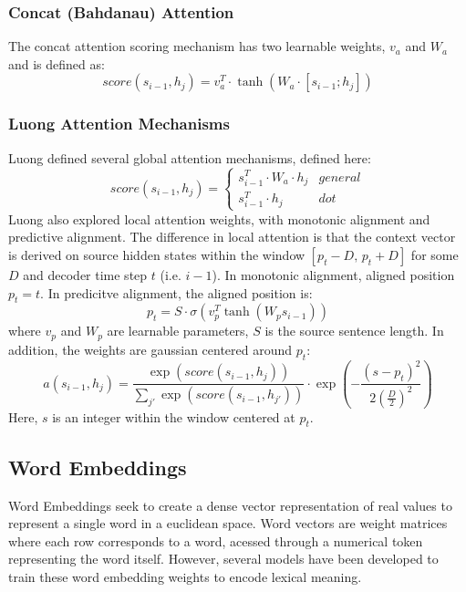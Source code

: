 \documentclass[twoside,twocolumn]{article}
\begin{document}
\subsubsection{Concat (Bahdanau) Attention}
The concat attention scoring mechanism has two learnable weights, $v_a$ and $W_a$
and is defined as:
\begin{equation}
  score(s_{i-1}, h_j) = v_a^T \cdot \tanh \left( W_a \cdot \left[ s_{i-1} ; h_j \right] \right)
\end{equation}
\subsubsection{Luong Attention Mechanisms}
Luong defined several global attention mechanisms, defined here:
\begin{equation}
  score(s_{i-1}, h_j) =
    \begin{cases}
      s_{i-1}^T \cdot W_a \cdot h_j & general \\
      s_{i-1}^T \cdot h_j & dot
    \end{cases}
\end{equation}
Luong also explored local attention weights, with monotonic alignment and
predictive alignment. The difference in local attention is that the
context vector is derived on source hidden states within the window
$\left[p_t - D , \, p_t + D\right]$ for some $D$ and decoder time step $t$ (i.e. $i-1$).
In monotonic alignment, aligned position $p_t=t$.
In predicitve alignment, the aligned position is:
\begin{equation}
  p_t = S \cdot \sigma \left( v_p^T \tanh \left( W_p s_{i-1} \right) \right)
\end{equation}
where $v_p$ and $W_p$ are learnable parameters,
$S$ is the source sentence length. In addition, the weights are gaussian centered
around $p_t$:
\begin{equation}
  a(s_{i-1}, h_j) = \frac{\exp(score(s_{i-1}, h_j))}{\sum_{j'} \exp(score(s_{i-1}, h_{j'}))} \cdot \exp\left(-\frac{(s-p_t)^2}{2\left(\frac{D}{2}\right)^2}\right)
\end{equation}
Here, $s$ is an integer within the window centered at $p_t$.


\subsection{Word Embeddings}
Word Embeddings seek to create a dense vector representation of real values
to represent a single word in a euclidean space. Word vectors are weight matrices
where each row corresponds to a word, acessed through a numerical token representing
the word itself. However, several models have been developed to train these
word embedding weights to encode lexical meaning.
\end{document}
